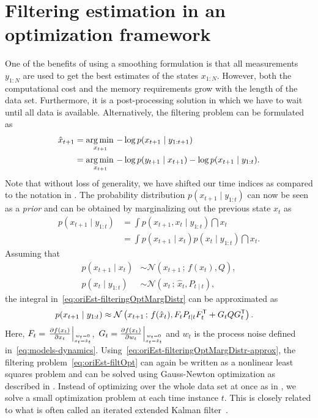 \section{Filtering estimation in an optimization framework}
\label{sec:oriEst-filteringOpt}
One of the benefits of using a smoothing formulation is that all measurements $y_{1:N}$ are used to get the best estimates of the states $x_{1:N}$. However, both the computational cost and the memory requirements grow with the length of the data set. Furthermore, it is a post-processing solution in which we have to wait until all data is available. Alternatively, the filtering problem can be formulated as 
\begin{align}
\label{eq:oriEst-filtOpt}
\hat{x}_{t+1} &= \operatorname*{arg \, min \,}_{x_{t+1}} - \log p(x_{t+1} \mid y_{1:t+1}) \nonumber \\
&= \operatorname*{arg \, min \,}_{x_{t+1}} - \log p(y_{t+1} \mid x_{t+1}) - \log p(x_{t+1} \mid y_{1:t}).
\end{align}
Note that without loss of generality, we have shifted our time indices as compared to the notation in . The probability distribution $p(x_{t+1} \mid y_{1:t})$ can now be seen as a \emph{prior} and can be obtained by marginalizing out the previous state $x_{t}$ as
\begin{align}
\label{eq:oriEst-filteringOptMargDistr}
p(x_{t+1}  \mid y_{1:t}) &= \int p(x_{t+1} , x_{t} \mid y_{1:t} ) \dint x_{t} \nonumber \\
&= \int p(x_{t+1} \mid x_{t}) p(x_{t} \mid y_{1:t}) \dint x_{t}.
\end{align}
Assuming that
\begin{subequations}
\begin{align}
p(x_{t+1} \mid x_{t}) &\sim \mathcal{N}( x_{t+1} \, ; \, f(x_{t}), Q),  \\
p(x_{t} \mid y_{1:t}) &\sim \mathcal{N}( x_{t} \, ; \, \hat{x}_{t}, P_{t \mid t}),
\end{align}
\end{subequations}
the integral in~\eqref{eq:oriEst-filteringOptMargDistr} can be approximated as
\begin{align}
\label{eq:oriEst-filteringOptMargDistr-approx}
p(x_{t+1} \mid y_{1:t}) &\approx \mathcal{N}\left( x_{t+1} \, ; \,  f(\hat{x}_{t}), F_{t} P_{t \mid t} F_{t}^{\mathsf{T}} + G_{t} Q G_{t}^{\mathsf{T}} \right).
\end{align}
Here, $F_{t} = \givenThat{\tfrac{\partial f(x_{t})}{\partial x_{t}}}{x_t = \hat{x}_t}{w_t = 0}$, $\givenThat{G_{t} = \tfrac{\partial f(x_{t})}{\partial w_{t}}}{x_t = \hat{x}_t}{w_t = 0}$ and $w_t$ is the process noise defined in~\eqref{eq:models-dynamics}. Using~\eqref{eq:oriEst-filteringOptMargDistr-approx}, the filtering problem~\eqref{eq:oriEst-filtOpt} can again be written as a nonlinear least squares problem and can be solved using Gauss-Newton optimization as described in . Instead of optimizing over the whole data set at once as in , we solve a small optimization problem at each time instance $t$. This is closely related to what is often called an iterated extended Kalman filter~\cite{jazwinski:1970,skoglundHA:2015}.


